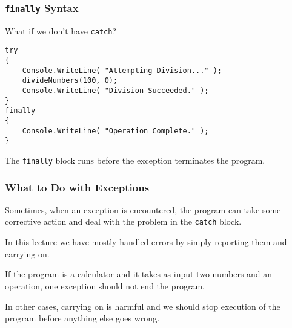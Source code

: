 \begin{frame}[fragile]
\frametitle{\texttt{finally} Syntax}

What if we don't have \texttt{catch}?

\begin{verbatim}
try
{
    Console.WriteLine( "Attempting Division..." );
    divideNumbers(100, 0);
    Console.WriteLine( "Division Succeeded." );
}
finally
{
    Console.WriteLine( "Operation Complete." );
}
\end{verbatim}

The \texttt{finally} block runs before the exception terminates the program.

\end{frame}



\begin{frame}
\frametitle{What to Do with Exceptions}

Sometimes, when an exception is encountered, the program can take some corrective action and deal with the problem in the \texttt{catch} block.

In this lecture we have mostly handled errors by simply reporting them and carrying on.

If the program is a calculator and it takes as input two numbers and an operation, one exception should not end the program.

In other cases, carrying on is harmful and we should stop execution of the program before anything else goes wrong.

\end{frame}






